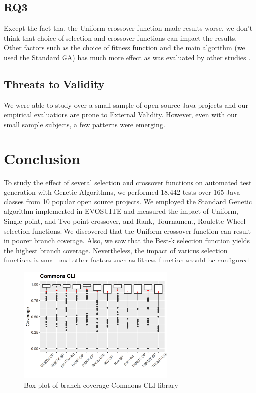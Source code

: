 \documentclass[sigconf]{acmart}
\begin{document}
\subsection{RQ3}
Except the fact that the Uniform crossover function made results worse, we don't think that choice of 
selection and crossover functions can impact the results. Other factors such as the choice of fitness function and 
the main algorithm (we used the Standard GA) has much more effect as was evaluated by other studies 
\cite{CAMPOS2018207}.

\subsection{Threats to Validity}
We were able to study over a small sample of open source Java projects and our empirical evaluations are prone 
to External Validity. However, even with our small sample subjects, a few patterns were emerging. 

\section{Conclusion}
\label{conclusion}
To study the effect of several selection and crossover functions on automated test generation with  
Genetic Algorithms, we performed 18,442 tests over 165 Java classes from 10 popular open source projects. 
We employed the Standard Genetic algorithm implemented in EVOSUITE and measured the impact of 
Uniform, Single-point, and Two-point crossover, and Rank, Tournament, Roulette Wheel selection functions.
We discovered that the Uniform crossover function can result in poorer branch coverage. Also, we saw that
the Best-k selection function yields the highest branch coverage. Nevertheless, the impact of various 
selection functions is small and other factors such as fitness function should be configured. 





\begin{figure}[h]
  \centering
  \includegraphics[width=3in]{../output/commons-cli-boxplot.png}
  \caption{Box plot of branch coverage Commons CLI library}
  \label{fig:boxplot1}
\end{figure}
\end{document}
